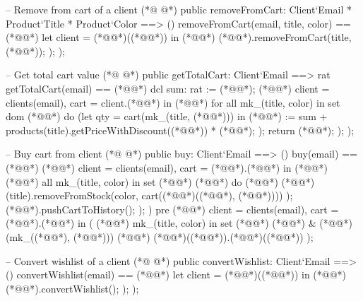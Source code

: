 \begin{vdmpp}[breaklines=true]
 -- Remove from cart of a client
(*@
\label{removeFromCart:164}
@*)
 public removeFromCart: Client`Email * Product`Title * Product`Color ==> ()
 removeFromCart(email, title, color) == (*@\vdmnotcovered{(}@*)
  let client = (*@@*)((*@@*))
  in (*@\vdmnotcovered{(}@*)
   (*@@*).removeFromCart(title, (*@@*));
  );
 );
 
 -- Get total cart value
(*@
\label{getTotalCart:173}
@*)
 public getTotalCart: Client`Email ==> rat
 getTotalCart(email) == (*@\vdmnotcovered{(}@*)
  dcl sum: rat := (*@@*);
  (*@@*) client = clients(email), cart = client.(*@@*)
  in (*@\vdmnotcovered{(}@*)
   for all mk_(title, color) in set dom (*@@*)
    do (let qty = cart(mk_(title, (*@@*)))
     in (*@@*) := sum + products(title).getPriceWithDiscount((*@@*)) * (*@@*);
    );
   return (*@@*);
  );
 );
 
 -- Buy cart from client
(*@
\label{buy:187}
@*)
 public buy: Client`Email ==> ()
 buy(email) == (*@\vdmnotcovered{(}@*)
  (*@@*) client = clients(email), cart = (*@@*).(*@@*)
  in (*@\vdmnotcovered{(}@*)
   (*@@*) all mk_(title, color) in set (*@@*) (*@@*)
    do (*@\vdmnotcovered{(}@*)
     (*@@*)(title).removeFromStock(color, cart((*@@*)((*@@*), (*@@*))))
    );
   (*@@*).pushCartToHistory();
  );
 )
 pre (*@@*) client = clients(email), cart = (*@@*).(*@@*)
  in (
   (*@@*) mk_(title, color) in set (*@@*) (*@@*)
    & (*@@*)(mk_((*@@*), (*@@*))) (*@\vdmnotcovered{<=}@*) (*@@*)((*@@*)).(*@@*)((*@@*))
  );
 
 -- Convert wishlist of a client
(*@
\label{convertWishlist:205}
@*)
 public convertWishlist: Client`Email ==> ()
 convertWishlist(email) == (*@\vdmnotcovered{(}@*)
  let client = (*@@*)((*@@*))
  in (*@\vdmnotcovered{(}@*)
   (*@@*).convertWishlist();
  );
 );
 

\end{vdmpp}
